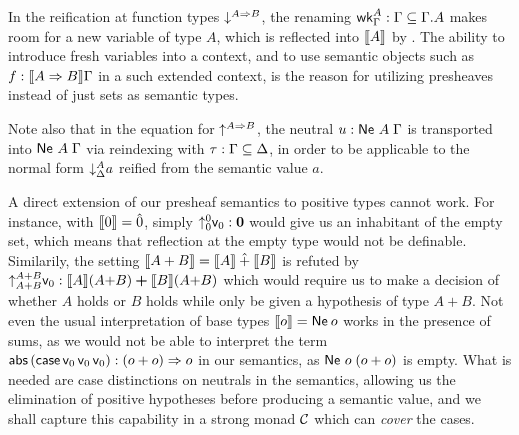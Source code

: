 \documentclass[a4paper,USenglish,cleveref, autoref]{lipics-v2019}
\begin{document}
In the reification at function types
$\down{A \To B}$,
the renaming $\twk^A_\Gamma : \Gamma \sublist \cext \Gamma A$
makes room
for a new variable of type $A$, which is reflected into $\den A$ by
.
The ability to introduce fresh variables into a context, and to use
semantic objects such as $f : \den{A \To B}\Gamma$ in a such extended
context, is the reason for utilizing presheaves instead of just sets
as semantic types.

Note also that in the equation for $\up{A \To B}$,
the neutral $u : \Ne A \Gamma$ is
transported into $\Ne A \Gamma$ via reindexing with
$\tau : \Gamma \sublist \Delta$, in order to be applicable to the normal form
$\down[\Delta]A a$
reified from the semantic value $a$.

A direct extension of our presheaf semantics to positive types cannot
work.  For instance, with $\den \tyzero = \hat0$, simply
$\up[\tyzero] \tyzero \vv0 : \bzero$ would give us an
inhabitant of the empty set, which means that reflection at the empty
type would not be definable.  Similarily, the setting
$\den{A + B} = \den A \hatplus \den B$ is refuted by
$\up[A + B]{A + B} \vv0 : \den A (A{+}B) \bplus \den B (A{+}B)$
which would require us to make a decision of whether $A$ holds or $B$ holds
while only be given a hypothesis of type $A + B$.
Not even the usual interpretation of base types $\den o = \tNe\,o$
works in the presence of sums, as we would not be able to interpret
the term
$\tabs\,(\tcase\,\vv0\,\vv0\,\vv0) :
(o+o) \To o$ in our semantics, as $\Ne o (o+o)$ is empty.
What is needed are case distinctions on neutrals in the semantics,
allowing us the elimination of positive hypotheses before producing a
semantic value,
and we shall capture this capability in a strong monad $\C$
which can \emph{cover} the cases.
\end{document}
